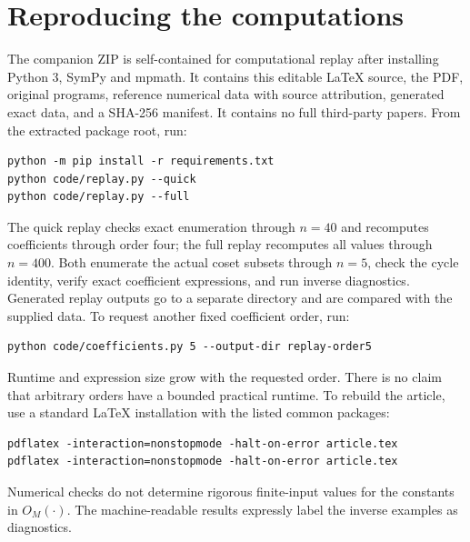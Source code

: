 \documentclass[11pt,letterpaper]{article}
\theoremstyle{remark}\newtheorem{remark}[theorem]{Remark}
\begin{document}
\section{Reproducing the computations}
\label{pdc:app:reproduction}
The companion ZIP is self-contained for computational replay after installing Python 3, SymPy and mpmath. It contains this editable \LaTeX{} source, the PDF, original programs, reference numerical data with source attribution, generated exact data, and a SHA-256 manifest. It contains no full third-party papers. From the extracted package root, run:
\begin{lstlisting}
python -m pip install -r requirements.txt
python code/replay.py --quick
python code/replay.py --full
\end{lstlisting}
The quick replay checks exact enumeration through $n=40$ and recomputes coefficients through order four; the full replay recomputes all values through $n=400$. Both enumerate the actual coset subsets through $n=5$, check the cycle identity, verify exact coefficient expressions, and run inverse diagnostics. Generated replay outputs go to a separate directory and are compared with the supplied data. To request another fixed coefficient order, run:
\begin{lstlisting}
python code/coefficients.py 5 --output-dir replay-order5
\end{lstlisting}
Runtime and expression size grow with the requested order. There is no claim that arbitrary orders have a bounded practical runtime. To rebuild the article, use a standard \LaTeX{} installation with the listed common packages:
\begin{lstlisting}
pdflatex -interaction=nonstopmode -halt-on-error article.tex
pdflatex -interaction=nonstopmode -halt-on-error article.tex
\end{lstlisting}
Numerical checks do not determine rigorous finite-input values for the constants in $O_M(\cdot)$. The machine-readable results expressly label the inverse examples as diagnostics.
\end{document}
